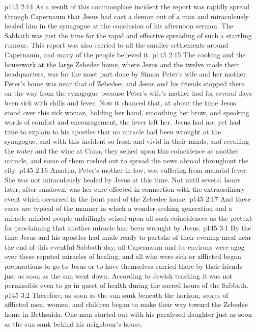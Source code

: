 \vs p145 2:14 As a result of this commonplace incident the report was rapidly spread through Capernaum that Jesus had cast a demon out of a man and miraculously healed him in the synagogue at the conclusion of his afternoon sermon. The Sabbath was just the time for the rapid and effective spreading of such a startling rumour. This report was also carried to all the smaller settlements around Capernaum, and many of the people believed it.
\vs p145 2:15 \pc The cooking and the housework at the large Zebedee home, where Jesus and the twelve made their headquarters, was for the most part done by Simon Peter’s wife and her mother. Peter’s home was near that of Zebedee; and Jesus and his friends stopped there on the way from the synagogue because Peter’s wife’s mother had for several days been sick with chills and fever. Now it chanced that, at about the time Jesus stood over this sick woman, holding her hand, smoothing her brow, and speaking words of comfort and encouragement, the fever left her. Jesus had not yet had time to explain to his apostles that no miracle had been wrought at the synagogue; and with this incident so fresh and vivid in their minds, and recalling the water and the wine at Cana, they seized upon this coincidence as another miracle, and some of them rushed out to spread the news abroad throughout the city.
\vs p145 2:16 Amatha, Peter’s mother\hyp{}in\hyp{}law, was suffering from malarial fever. She was not miraculously healed by Jesus at this time. Not until several hours later, after sundown, was her cure effected in connection with the extraordinary event which occurred in the front yard of the Zebedee home.
\vs p145 2:17 \pc And these cases are typical of the manner in which a wonder\hyp{}seeking generation and a miracle\hyp{}minded people unfailingly seized upon all such coincidences as the pretext for proclaiming that another miracle had been wrought by Jesus.
\vs p145 3:1 By the time Jesus and his apostles had made ready to partake of their evening meal near the end of this eventful Sabbath day, all Capernaum and its environs were agog over these reputed miracles of healing; and all who were sick or afflicted began preparations to go to Jesus or to have themselves carried there by their friends just as soon as the sun went down. According to Jewish teaching it was not permissible even to go in quest of health during the sacred hours of the Sabbath.
\vs p145 3:2 Therefore, as soon as the sun sank beneath the horizon, scores of afflicted men, women, and children began to make their way toward the Zebedee home in Bethsaida. One man started out with his paralysed daughter just as soon as the sun sank behind his neighbour’s house.
